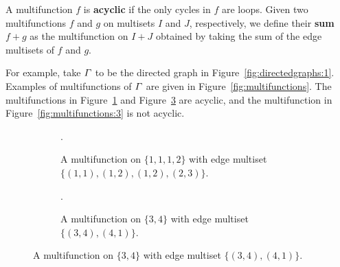 \documentclass[11pt]{article}
\theoremstyle{definition}
\numberwithin{equation}{section}
\newcommand{\vocab}[1]{\textbf{#1}}
\begin{document}
A multifunction \(f\) is \vocab{acyclic} if the only cycles in \(f\) are loops.
Given two multifunctions \(f\) and \(g\) on multisets \(I\) and \(J\), respectively, we define their \vocab{sum} \(f + g\) as the multifunction on \(I + J\) obtained by taking the sum of the edge multisets of \(f\) and \(g\).

For example, take \(\varGamma\) to be the directed graph in Figure~\ref{fig:directedgraphs:1}.
Examples of multifunctions of \(\varGamma\) are given in Figure~\ref{fig:multifunctions}.
The multifunctions in Figure~\ref{fig:multifunctions:1} and Figure~\ref{fig:multifunctions:2} are acyclic, and the multifunction in Figure~\ref{fig:multifunctions:3} is not acyclic.

\begin{figure}[htpb]
    \centering
    \begin{subfigure}[t]{0.29\textwidth}
        \centering
        .
        \caption{A multifunction on \(\{1,\allowbreak 1,\allowbreak 1,\allowbreak 2\}\) with edge multiset \(\{(1, 1),\allowbreak (1, 2),\allowbreak (1, 2),\allowbreak (2, 3)\}\).}
        \label{fig:multifunctions:1}
    \end{subfigure}
    \hfill
    \begin{subfigure}[t]{0.28\textwidth}
        \centering
        .
        \caption{A multifunction on \(\{3,\allowbreak 4\}\) with edge multiset \(\{(3, 4),\allowbreak (4, 1)\}\).}
        \label{fig:multifunctions:2}
    \end{subfigure}

\end{figure}
\end{document}
